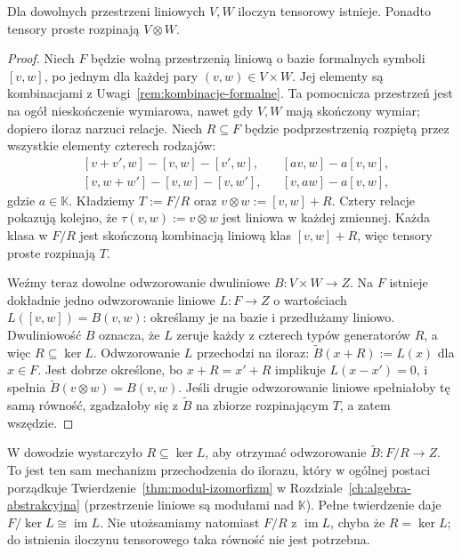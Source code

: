 \begin{twierdzenie}
\label{thm:tensor-istnienie}
Dla dowolnych przestrzeni liniowych $V,W$ iloczyn tensorowy istnieje.
Ponadto tensory proste rozpinają $V\otimes W$.
\end{twierdzenie}
\begin{proof}
Niech $F$ będzie wolną przestrzenią liniową o bazie formalnych
symboli $[v,w]$, po jednym dla każdej pary $(v,w)\in V\times W$.
Jej elementy są kombinacjami z Uwagi~\ref{rem:kombinacje-formalne}.
Ta pomocnicza przestrzeń jest na ogół nieskończenie wymiarowa,
nawet gdy $V,W$ mają skończony wymiar; dopiero iloraz narzuci relacje.
Niech $R\subseteq F$ będzie podprzestrzenią rozpiętą przez
wszystkie elementy czterech rodzajów:
\begin{align*}
 &[v+v',w]-[v,w]-[v',w],
 &&[av,w]-a[v,w],\\
 &[v,w+w']-[v,w]-[v,w'],
 &&[v,aw]-a[v,w],
\end{align*}
gdzie $a\in\mathbb K$. Kładziemy $T:=F/R$ oraz
$v\otimes w:=[v,w]+R$. Cztery relacje pokazują kolejno,
że $\tau(v,w):=v\otimes w$ jest liniowa w każdej zmiennej.
Każda klasa w $F/R$ jest skończoną kombinacją liniową klas $[v,w]+R$,
więc tensory proste rozpinają $T$.

Weźmy teraz dowolne odwzorowanie dwuliniowe $B\colon V\times W\to Z$.
Na $F$ istnieje dokładnie jedno odwzorowanie liniowe
$L\colon F\to Z$ o wartościach $L([v,w])=B(v,w)$:
określamy je na bazie i przedłużamy liniowo. Dwuliniowość $B$
oznacza, że $L$ zeruje każdy z czterech typów generatorów $R$,
a więc $R\subseteq\ker L$. Odwzorowanie $L$ przechodzi na iloraz:
$\widetilde B(x+R):=L(x)$ dla $x\in F$. Jest dobrze określone, bo
$x+R=x'+R$ implikuje $L(x-x')=0$, i spełnia
$\widetilde B(v\otimes w)=B(v,w)$. Jeśli drugie odwzorowanie liniowe
spełniałoby tę samą równość, zgadzałoby się z $\widetilde B$
na zbiorze rozpinającym $T$, a zatem wszędzie.
\end{proof}

\begin{uwaga}
\label{rem:tensor-iloraz-izomorfizm}
W dowodzie wystarczyło $R\subseteq\ker L$, aby otrzymać
odwzorowanie $\widetilde B:F/R\to Z$. To jest ten sam mechanizm
przechodzenia do ilorazu, który w ogólnej postaci
porządkuje Twierdzenie~\ref{thm:modul-izomorfizm}
w Rozdziale~\ref{ch:algebra-abstrakcyjna}
(przestrzenie liniowe są modułami nad $\mathbb K$).
Pełne twierdzenie daje $F/\ker L\cong\operatorname{im}L$.
Nie utożsamiamy natomiast $F/R$ z $\operatorname{im}L$,
chyba że $R=\ker L$; do istnienia iloczynu tensorowego
taka równość nie jest potrzebna.
\end{uwaga}

